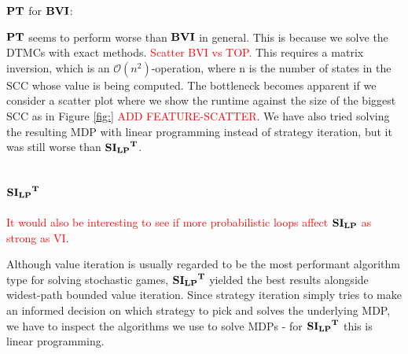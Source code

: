 $\mathbf{PT}$ for $\mathbf{BVI}$:

$\mathbf{PT}$ seems to perform worse than $\mathbf{BVI}$ in general. This is because we solve the DTMCs with exact methods. 
\textcolor{red}{Scatter BVI vs TOP.}
This requires a matrix inversion, which is an $\mathcal{O}(n^{2})$-operation, where n is the number of states in the SCC whose value is being computed.
The bottleneck becomes apparent if we consider a scatter plot where we show the runtime against the size of the biggest SCC as in Figure \ref{fig:} \textcolor{red}{ADD FEATURE-SCATTER}.
We have also tried solving the resulting MDP with linear programming instead of strategy iteration, but it was still worse than $\mathbf{\mathbf{SI_{LP}}^T}$.


\subsection{$\mathbf{\mathbf{SI_{LP}}^T}$}
\textcolor{red}{It would also be interesting to see if more probabilistic loops affect $\mathbf{SI_{LP}}$ as strong as VI}.

Although value iteration is usually regarded to be the most performant algorithm type for solving stochastic games, 
$\mathbf{\mathbf{SI_{LP}}^T}$ yielded the best results alongside widest-path bounded value iteration.
Since strategy iteration simply tries to make an informed decision on which strategy to pick and solves the underlying MDP, 
we have to inspect the algorithms we use to solve MDPs - for $\mathbf{\mathbf{SI_{LP}}^T}$ this is linear programming.

